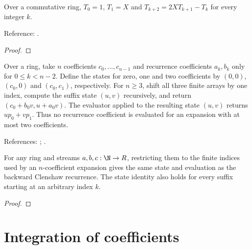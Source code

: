 \begin{supporting}

\begin{theorem}
\label{thm:chebyshev-recurrence}
\mathlibok
Over a commutative ring, $T_0=1$, $T_1=X$ and
$T_{k+2}=2XT_{k+1}-T_k$ for every integer $k$.

Reference: \cite[Table 18.9.1]{dlmf}.
\end{theorem}
\begin{proof}
\mathlibok
\end{proof}

\begin{definition}
\label{def:finite-clenshaw}
\leanok
Over a ring, take $n$ coefficients $c_0,\ldots,c_{n-1}$ and recurrence
coefficients $a_k,b_k$ only for $0\le k<n-2$.
Define the states for zero, one and two coefficients by
$(0,0)$, $(c_0,0)$ and $(c_0,c_1)$, respectively.
For $n\ge3$, shift all three finite arrays by one index, compute the suffix
state $(u,v)$ recursively, and return $(c_0+b_0v,u+a_0v)$.
The evaluator applied to the resulting state $(u,v)$ returns $up_0+vp_1$.
Thus no recurrence coefficient is evaluated for an expansion with at most two coefficients.

References: \cite{clenshaw}; \cite[18.40(i)]{dlmf}.
\end{definition}

\begin{theorem}
\label{thm:finite-clenshaw}
\leanok
For any ring and streams $a,b,c:\N\to R$, restricting them to the finite
indices used by an $n$-coefficient expansion gives the same state and evaluation
as the backward Clenshaw recurrence. The state identity also holds for every
suffix starting at an arbitrary index $k$.
\end{theorem}
\begin{proof}
\leanok
\end{proof}

\end{supporting}

\section{Integration of coefficients}\label{sec:textbook-calculus-integration}

